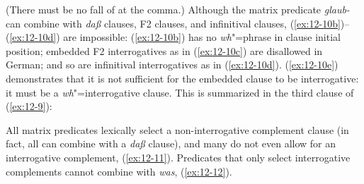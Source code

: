 \documentclass[output=paper]{langsci/langscibook}
\begin{document}
(There must be no fall of  at the comma.) Although the
matrix predicate \textit{glaub-} can combine with \textit{daß} clauses,
F2 clauses, and infinitival clauses, (\ref{ex:12-10b})--(\ref{ex:12-10d}) are impossible:
(\ref{ex:12-10b}) has no \emph{wh}"=phrase in clause initial position; embedded F2
interrogatives as in (\ref{ex:12-10c}) are disallowed in German; and so are
infinitival interrogatives as in (\ref{ex:12-10d}). (\ref{ex:12-10e}) demonstrates that it
is not sufficient for the embedded clause to be interrogative: it must
be a \textit{wh}"=interrogative clause. This is summarized in the third
clause of (\ref{ex:12-9}):
\begin{exe}
\begin{xlist}
\end{xlist}
\end{exe}        
All matrix predicates lexically select a non-interrogative complement
clause (in fact, all can combine with a \textit{daß} clause), and many
do not even allow for an interrogative complement, (\ref{ex:12-11}). Predicates
that only select interrogative complements cannot combine with
\textit{was}, (\ref{ex:12-12}).
\addlines
\begin{exe}
\ex
\label{ex:12-11}
\begin{xlist}
\end{xlist}
\ex
\label{ex:12-12}
\begin{xlist}
\end{xlist}
\end{exe}
\end{document}
